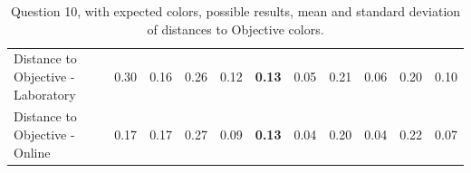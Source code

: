 \begin{table}[htbp]
{\begin{tabular}{lccccccccccccc}
    \multicolumn{4}{l}{Distance to Objective - Laboratory}                                                                                           & \multicolumn{1}{|c}{0.30}       & \multicolumn{1}{c|}{0.16}    & \multicolumn{1}{|c}{0.26}       & \multicolumn{1}{c|}{0.12}    & \multicolumn{1}{|c}{\textbf{0.13}}       & \multicolumn{1}{c|}{0.05}    & \multicolumn{1}{|c}{0.21}       & \multicolumn{1}{c|}{0.06}    & \multicolumn{1}{|c}{0.20}       & \multicolumn{1}{c|}{0.10}    \\
    \multicolumn{4}{l}{Distance to Objective - Online}                                                                                               & \multicolumn{1}{|c}{0.17}        & \multicolumn{1}{c|}{0.17}    & \multicolumn{1}{|c}{0.27}        & \multicolumn{1}{c|}{0.09}    & \multicolumn{1}{|c}{\textbf{0.13}}       & \multicolumn{1}{c|}{0.04}    & \multicolumn{1}{|c}{0.20}        & \multicolumn{1}{c|}{0.04}    & \multicolumn{1}{|c}{0.22}       & \multicolumn{1}{c|}{0.07}    \\ \hline
    \end{tabular}}
  \caption[Question 10, with expected Results.]{Question 10, with expected colors, possible results, mean and standard deviation of distances to Objective colors.}
  \label{table:lab_q10_expected}
\end{table}
%
